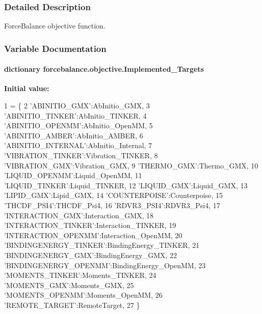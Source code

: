 \subsubsection{Detailed Description}
Force\-Balance objective function. 

\subsubsection{Variable Documentation}
\hypertarget{namespaceforcebalance_1_1objective_a8c93e21f995ed17addb493ec94368ab5}{
\paragraph[{Implemented\-\_\-\-Targets}]{\setlength{\rightskip}{0pt plus 5cm}dictionary forcebalance.\-objective.\-Implemented\-\_\-\-Targets}}\label{namespaceforcebalance_1_1objective_a8c93e21f995ed17addb493ec94368ab5}
{\bfseries Initial value\-:}
\begin{DoxyCode}
1 = \{
2     \textcolor{stringliteral}{'ABINITIO\_GMX'}:AbInitio\_GMX,
3     \textcolor{stringliteral}{'ABINITIO\_TINKER'}:AbInitio\_TINKER,
4     \textcolor{stringliteral}{'ABINITIO\_OPENMM'}:AbInitio\_OpenMM,
5     \textcolor{stringliteral}{'ABINITIO\_AMBER'}:AbInitio\_AMBER,
6     \textcolor{stringliteral}{'ABINITIO\_INTERNAL'}:AbInitio\_Internal,
7     \textcolor{stringliteral}{'VIBRATION\_TINKER'}:Vibration\_TINKER,
8     \textcolor{stringliteral}{'VIBRATION\_GMX'}:Vibration\_GMX,
9     \textcolor{stringliteral}{'THERMO\_GMX'}:Thermo\_GMX,
10     \textcolor{stringliteral}{'LIQUID\_OPENMM'}:Liquid\_OpenMM,
11     \textcolor{stringliteral}{'LIQUID\_TINKER'}:Liquid\_TINKER, 
12     \textcolor{stringliteral}{'LIQUID\_GMX'}:Liquid\_GMX, 
13     \textcolor{stringliteral}{'LIPID\_GMX'}:Lipid\_GMX, 
14     \textcolor{stringliteral}{'COUNTERPOISE'}:Counterpoise,
15     \textcolor{stringliteral}{'THCDF\_PSI4'}:THCDF\_Psi4,
16     \textcolor{stringliteral}{'RDVR3\_PSI4'}:RDVR3\_Psi4,
17     \textcolor{stringliteral}{'INTERACTION\_GMX'}:Interaction\_GMX,
18     \textcolor{stringliteral}{'INTERACTION\_TINKER'}:Interaction\_TINKER,
19     \textcolor{stringliteral}{'INTERACTION\_OPENMM'}:Interaction\_OpenMM,
20     \textcolor{stringliteral}{'BINDINGENERGY\_TINKER'}:BindingEnergy\_TINKER,
21     \textcolor{stringliteral}{'BINDINGENERGY\_GMX'}:BindingEnergy\_GMX,
22     \textcolor{stringliteral}{'BINDINGENERGY\_OPENMM'}:BindingEnergy\_OpenMM,
23     \textcolor{stringliteral}{'MOMENTS\_TINKER'}:Moments\_TINKER,
24     \textcolor{stringliteral}{'MOMENTS\_GMX'}:Moments\_GMX,
25     \textcolor{stringliteral}{'MOMENTS\_OPENMM'}:Moments\_OpenMM,
26     \textcolor{stringliteral}{'REMOTE\_TARGET'}:RemoteTarget,
27     \}
\end{DoxyCode}



